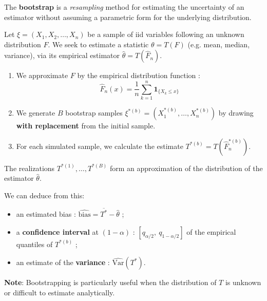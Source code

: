 \begin{f}
	
	The \textbf{bootstrap} is a \textit{resampling} method for estimating the uncertainty of an estimator without assuming a parametric form for the underlying distribution.
	
	Let \(\xi = (X_1, X_2, \ldots, X_n)\) be a sample of iid variables following an unknown distribution \(F\). We seek to estimate a statistic \(\theta = T(F)\) (e.g. mean, median, variance), via its empirical estimator \(\hat{\theta} = T(\hat{F}_n)\).
	
	\begin{enumerate}
		\item We approximate \(F\) by the empirical distribution function :
		\[
		\hat{F}_n(x) = \frac{1}{n} \sum_{k=1}^n \mathbf{1}_{\{X_k \le x\}}
		\]
		
		\item We generate \(B\) bootstrap samples \(\xi^{\ast(b)} = (X_1^{\ast(b)}, \ldots, X_n^{\ast(b)})\) by drawing \textbf{with replacement} from the initial sample.
		
		\item For each simulated sample, we calculate the estimate \(T^{\ast(b)} = T(\hat{F}_n^{\ast(b)})\).
	\end{enumerate}
	
	The realizations \(T^{\ast(1)}, \ldots, T^{\ast(B)}\) form an approximation of the distribution of the estimator \(\hat{\theta}\).
	
	We can deduce from this:
	\begin{itemize}[nosep]
		\item an estimated bias : \(\widehat{\text{bias}} = \overline{T^\ast} - \hat{\theta}\) ;
		\item a \textbf{confidence interval} at \((1-\alpha)\) : \([q_{\alpha/2},\ q_{1 - \alpha/2}]\) of the empirical quantiles of \(T^{\ast(b)}\) ;
		\item an estimate of the \textbf{variance} : \(\widehat{\mathrm{Var}}(T^\ast)\).
	\end{itemize}
	
	\textbf{Note}: Bootstrapping is particularly useful when the distribution of \(T\) is unknown or difficult to estimate analytically.
	
\end{f}

